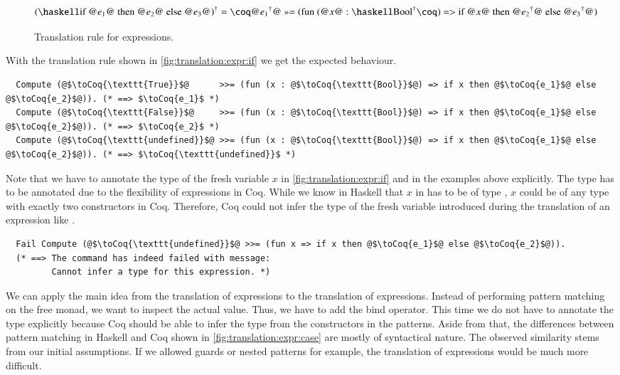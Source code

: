 \begin{figure}[H]
  \[
    \toCoq{(\haskellM{if @$e_1$@ then @$e_2$@ else @$e_3$@})}
      = \coqM{@$\toCoqX{e_1}$@ >>= (fun (@$x$@ :}\;\toCoq{\haskellM{Bool}}\coqM{) => if @$x$@ then @$\toCoqX{e_2}$@ else @$\toCoqX{e_3}$@)}
  \]
  \caption{Translation rule for  expressions.}
  \label{fig:translation:expr:if}
\end{figure}

With the translation rule shown in \autoref{fig:translation:expr:if} we get the expected behaviour.
\begin{verbatim}
  Compute (@$\toCoq{\texttt{True}}$@      >>= (fun (x : @$\toCoq{\texttt{Bool}}$@) => if x then @$\toCoq{e_1}$@ else @$\toCoq{e_2}$@)). (* ==> $\toCoq{e_1}$ *)
  Compute (@$\toCoq{\texttt{False}}$@     >>= (fun (x : @$\toCoq{\texttt{Bool}}$@) => if x then @$\toCoq{e_1}$@ else @$\toCoq{e_2}$@)). (* ==> $\toCoq{e_2}$ *)
  Compute (@$\toCoq{\texttt{undefined}}$@ >>= (fun (x : @$\toCoq{\texttt{Bool}}$@) => if x then @$\toCoq{e_1}$@ else @$\toCoq{e_2}$@)). (* ==> $\toCoq{\texttt{undefined}}$ *)
\end{verbatim}

Note that we have to annotate the type of the fresh variable $x$ in \autoref{fig:translation:expr:if} and in the examples above explicitly.
The type has to be annotated due to the flexibility of  expressions in Coq.
While we know in Haskell that $x$ in  has to be of type , $x$ could be of any type with exactly two constructors in Coq.
Therefore, Coq could not infer the type of the fresh variable introduced during the translation of an expression like .
\begin{verbatim}
  Fail Compute (@$\toCoq{\texttt{undefined}}$@ >>= (fun x => if x then @$\toCoq{e_1}$@ else @$\toCoq{e_2}$@)).
  (* ==> The command has indeed failed with message:
         Cannot infer a type for this expression. *)
\end{verbatim}

We can apply the main idea from the translation of  expressions to the translation of  expressions.
Instead of performing pattern matching on the free monad, we want to inspect the actual value.
Thus, we have to add the bind operator.
This time we do not have to annotate the type explicitly because Coq should be able to infer the type from the constructors in the patterns.
Aside from that, the differences between pattern matching in Haskell and Coq shown in \autoref{fig:translation:expr:case} are mostly of syntactical nature.
The observed similarity stems from our initial assumptions.
If we allowed guards or nested patterns for example, the translation of  expressions would be much more difficult.

